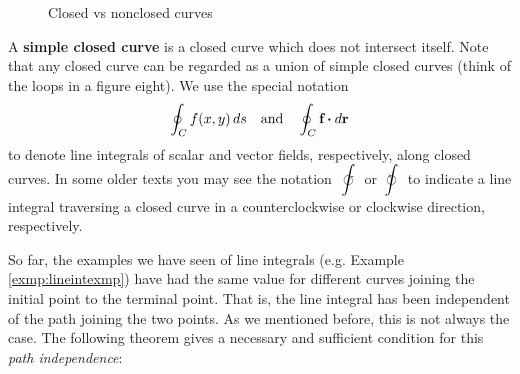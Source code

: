 \begin{figure}[h]
 \centering
 \qquad\qquad
 \caption[]{\quad Closed vs nonclosed curves}
 \label{fig:closedcurve}
\end{figure}

A \textbf{simple closed curve} is a closed curve which does not intersect itself. Note that any closed curve can be
regarded as a union of simple closed curves (think of the loops in a figure eight). We use the special notation
\begin{displaymath}
 \oint_C f(x,y)\,ds \quad\text{and}\quad \oint_C \textbf{f} \bm{\cdot} d\textbf{r}
\end{displaymath}
to denote line integrals of scalar and vector fields, respectively, along closed curves. In some older texts you may see the notation $\;\displaystyle\counterint\;$ or
$\;\displaystyle\clockint\;$ to indicate a line integral traversing a closed curve in a counterclockwise or
clockwise direction, respectively.

So far, the examples we have seen of line integrals (e.g. Example \ref{exmp:lineintexmp}) have had the same value
for different curves joining the initial point to the terminal point. That is, the line integral has been
independent of the path joining the two points. As we mentioned before, this is not always the case. The following
theorem gives a necessary and sufficient condition for this \emph{path independence}:

